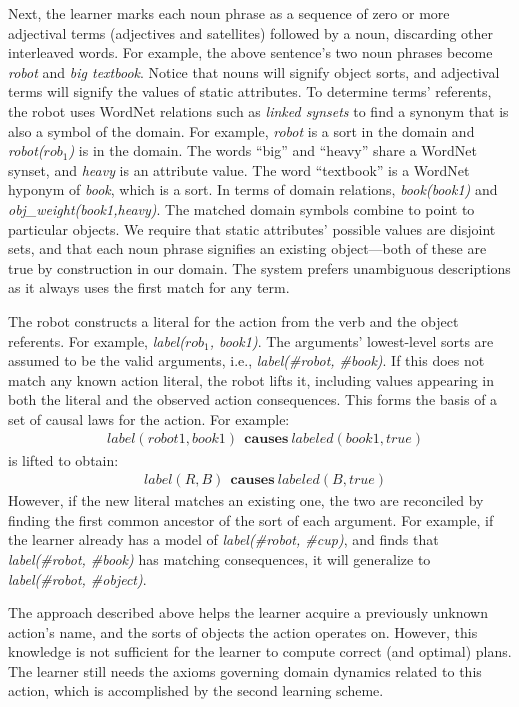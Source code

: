 \documentclass{article}
\begin{document}
Next, the learner marks each noun phrase as a sequence of zero or more
adjectival terms (adjectives and satellites) followed by a noun,
discarding other interleaved words. For example, the above sentence's
two noun phrases become \textit{robot} and \textit{big textbook}.
Notice that nouns will signify object sorts, and adjectival terms will
signify the values of static attributes. To determine terms'
referents, the robot uses WordNet relations such as \emph{linked
  synsets} to find a synonym that is also a symbol of the domain. For
example, \textit{robot} is a sort in the domain and
\textit{robot($rob_1$)} is in the domain. The words ``big'' and
``heavy'' share a WordNet synset, and \textit{heavy} is an attribute
value.  The word ``textbook'' is a WordNet hyponym of \textit{book},
which is a sort. In terms of domain relations, \textit{book(book1)}
and \textit{obj\_weight(book1,heavy)}. The matched domain symbols
combine to point to particular objects. We require that static
attributes' possible values are disjoint sets, and that each noun
phrase signifies an existing object---both of these are true by
construction in our domain. The system prefers unambiguous
descriptions as it always uses the first match for any term.

The robot constructs a literal for the action from the verb and the
object referents. For example, \textit{label($rob_1$, book1)}. The
arguments' lowest-level sorts are assumed to be the valid arguments,
i.e., \textit{label(\#robot, \#book)}. If this does not match any
known action literal, the robot lifts it, including values appearing
in both the literal and the observed action consequences. This forms
the basis of a set of causal laws for the action. For example:
\begin{align*}
  &label(robot1, book1)~~ \mathbf{causes}~labeled(book1, true)
\end{align*}
is lifted to obtain:
\begin{align*}
  &label(R, B)~~ \mathbf{causes}~labeled(B, true)
\end{align*}
However, if the new literal matches an existing one, the two are
reconciled by finding the first common ancestor of the sort of each
argument. For example, if the learner already has a model of
\textit{label(\#robot, \#cup)}, and finds that \textit{label(\#robot,
  \#book)} has matching consequences, it will generalize to
\textit{label(\#robot, \#object)}. 

The approach described above helps the learner acquire a previously
unknown action's name, and the sorts of objects the action operates
on. However, this knowledge is not sufficient for the learner to
compute correct (and optimal) plans. The learner still needs the
axioms governing domain dynamics related to this action, which is
accomplished by the second learning scheme.
\end{document}
